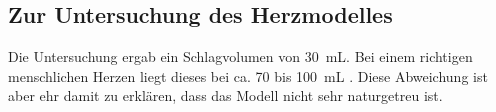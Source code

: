 \subsection{Zur Untersuchung des Herzmodelles}
Die Untersuchung ergab ein Schlagvolumen von \SI{30}{\milli\liter}. Bei einem
richtigen menschlichen Herzen liegt dieses bei ca. 70 bis \SI{100}{\milli\liter}
\cite{wiki}. Diese Abweichung ist aber ehr damit zu erklären, dass das Modell
nicht sehr naturgetreu ist.
